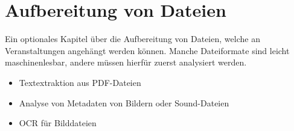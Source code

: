 \chapter{Aufbereitung von Dateien}
Ein optionales Kapitel über die Aufbereitung von Dateien, welche an Veranstaltungen angehängt werden können. Manche Dateiformate sind leicht maschinenlesbar, andere müssen hierfür zuerst analysiert werden.

\begin{itemize}
	\item Textextraktion aus PDF-Dateien
	\item Analyse von Metadaten von Bildern oder Sound-Dateien
	\item OCR für Bilddateien
\end{itemize}